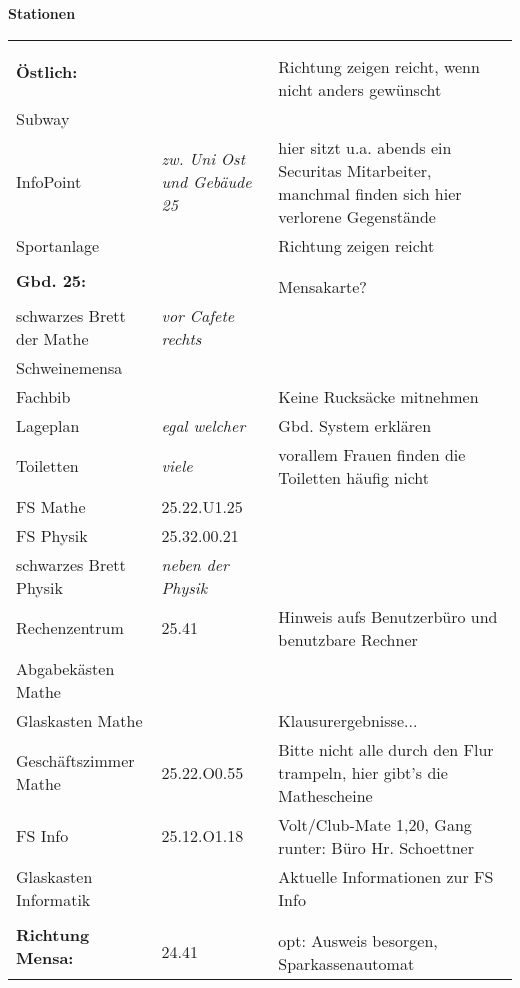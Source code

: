 \documentclass[a4paper,10pt]{article}
\begin{document}
{\LARGE \textbf{Stationen}}\\
\hspace{-10mm}
\begin{tabularx}{\textwidth}{p{}p{}p{}}
 \multirow{3}{*}{\textbf{Östlich:}} \\ & & \\
 Uni Ost &  & Richtung zeigen reicht, wenn nicht anders gewünscht \\
 Subway & & \\
 InfoPoint & \textit{zw. Uni Ost und Gebäude 25} & hier sitzt u.a. abends ein Securitas Mitarbeiter, manchmal finden sich hier verlorene Gegenstände \\
 Sportanlage &  & Richtung zeigen reicht \\
 \multirow{3}{*}{\textbf{Gbd. 25:}} \\ & & \\
 Cafete &  & Mensakarte? \\
 schwarzes Brett der Mathe & \textit{vor Cafete rechts} &  \\
 Schweinemensa &  & \\
 Fachbib & & Keine Rucksäcke mitnehmen \\
 Lageplan & \textit{egal welcher} & Gbd. System erklären \\
 Toiletten & \textit{viele} & vorallem Frauen finden die Toiletten häufig nicht \\
 FS Mathe & 25.22.U1.25 & \\
 FS Physik & 25.32.00.21 & \\
 schwarzes Brett Physik & \textit{neben der Physik} & \\
 Rechenzentrum & 25.41 & Hinweis aufs Benutzerbüro und benutzbare Rechner \\
 Abgabekästen Mathe &  & \\
 Glaskasten Mathe &  & Klausurergebnisse... \\ 
 Geschäftszimmer Mathe & 25.22.O0.55 & Bitte nicht alle durch den Flur trampeln, hier gibt's die Mathescheine \\
 FS Info & 25.12.O1.18 & Volt/Club-Mate 1,20, Gang runter: Büro Hr. Schoettner \\
 Glaskasten Informatik &  & Aktuelle Informationen zur FS Info \\
  \multirow{3}{*}{\textbf{Richtung Mensa:}} \\ & & \\
 UniBib & 24.41 & opt: Ausweis besorgen, Sparkassenautomat \\

\end{tabularx}
\end{document}
